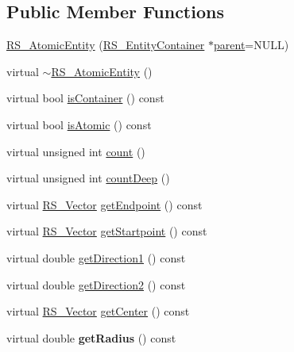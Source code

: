 \subsection*{Public Member Functions}
\begin{DoxyCompactItemize}
\item 
\hyperlink{classRS__AtomicEntity_abaf0dc8a9de97897ad33fad955101e74}{R\-S\-\_\-\-Atomic\-Entity} (\hyperlink{classRS__EntityContainer}{R\-S\-\_\-\-Entity\-Container} $\ast$\hyperlink{classRS__Entity_a80358a8d2fc6739a516a278dc500b49f}{parent}=N\-U\-L\-L)
\item 
virtual \hyperlink{classRS__AtomicEntity_a78ca30fac2c4a595f4165b90f5ee84b1}{$\sim$\-R\-S\-\_\-\-Atomic\-Entity} ()
\item 
virtual bool \hyperlink{classRS__AtomicEntity_acfd7cb0e64ab13c51185a0a019355d2e}{is\-Container} () const 
\item 
virtual bool \hyperlink{classRS__AtomicEntity_a6cdc2a83438fb51b13fec598f73da6a3}{is\-Atomic} () const 
\item 
virtual unsigned int \hyperlink{classRS__AtomicEntity_a9127e621b6bca6671250b02dcdd65013}{count} ()
\item 
virtual unsigned int \hyperlink{classRS__AtomicEntity_ac7f202f015827f03d86dd67a5f5d93e9}{count\-Deep} ()
\item 
virtual \hyperlink{classRS__Vector}{R\-S\-\_\-\-Vector} \hyperlink{classRS__AtomicEntity_a7c65ecfa3124659ad667ea20d7e42607}{get\-Endpoint} () const 
\item 
virtual \hyperlink{classRS__Vector}{R\-S\-\_\-\-Vector} \hyperlink{classRS__AtomicEntity_a5e2f2744b91283e110b98e1359c006cf}{get\-Startpoint} () const 
\item 
virtual double \hyperlink{classRS__AtomicEntity_af830be013d3492aab78525660e2721e8}{get\-Direction1} () const 
\item 
virtual double \hyperlink{classRS__AtomicEntity_a4b83b0f0d31b35914f2e86a67cac3a6c}{get\-Direction2} () const 
\item 
virtual \hyperlink{classRS__Vector}{R\-S\-\_\-\-Vector} \hyperlink{classRS__AtomicEntity_a66560af73a3de78729d9f0df1a3f0f96}{get\-Center} () const 
\item 
\hypertarget{classRS__AtomicEntity_afe54991823e511ac27c1002ec1e2f3b7}{virtual double {\bfseries get\-Radius} () const }\label{classRS__AtomicEntity_afe54991823e511ac27c1002ec1e2f3b7}


\end{DoxyCompactItemize}
